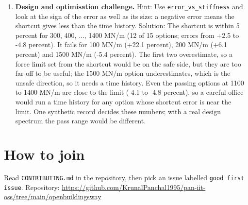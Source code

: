 \documentclass[11pt,a4paper]{article}
\begin{document}
\begin{enumerate}[nosep]
\item \textbf{Design and optimisation challenge.} Hint: Use \texttt{error\_vs\_stiffness} and look at the sign of the error as well as its size: a negative error means the shortcut gives less than the time history. Solution: The shortcut is within 5 percent for 300, 400, ..., 1400 MN/m (12 of 15 options; errors from +2.5 to -4.8 percent). It fails for 100 MN/m (+22.1 percent), 200 MN/m (+6.1 percent) and 1500 MN/m (-5.4 percent). The first two overestimate, so a force limit set from the shortcut would be on the safe side, but they are too far off to be useful; the 1500 MN/m option underestimates, which is the unsafe direction, so it needs a time history. Even the passing options at 1100 to 1400 MN/m are close to the limit (-4.1 to -4.8 percent), so a careful office would run a time history for any option whose shortcut error is near the limit. One synthetic record decides these numbers; with a real design spectrum the pass range would be different.
\end{enumerate}

\section{How to join}
Read \texttt{CONTRIBUTING.md} in the repository, then pick an issue labelled \texttt{good first issue}. Repository: \url{https://github.com/KrunalPanchal1995/pan-iit-oss/tree/main/openbuildingsway}
\end{document}
